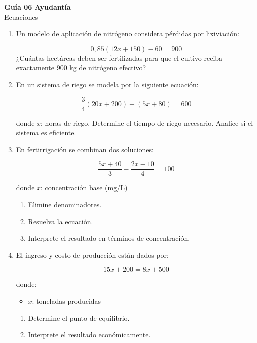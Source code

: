 \documentclass[11pt]{article}
\begin{document}
	
	\vspace*{0.5em}
	
	\begin{center}
		{\Large \textbf{Guía 06 Ayudantía}}\\[0.3em]
		{\small Ecuaciones}
	\end{center}
	
	\vspace{0.2cm}
	
	
	\begin{enumerate}
			\item 	Un modelo de aplicación de nitrógeno considera pérdidas por lixiviación:
			
			\[
			0{,}85(12x + 150) - 60 = 900
			\]
		¿Cuántas hectáreas deben ser fertilizadas para que el cultivo reciba exactamente 900 kg de nitrógeno efectivo?
		
		\item En un sistema de riego se modela por la siguiente ecuación:
				
		\[
		\frac{3}{4}(20x + 200) - (5x + 80) = 600
		\]
		
		donde $x$: horas de riego. Determine el tiempo de riego necesario. Analice si el sistema es eficiente.
		
		\item En fertirrigación se combinan dos soluciones:
		
		\[
		\frac{5x + 40}{3} - \frac{2x - 10}{4} = 100
		\]
		
		donde $x$: concentración base (mg/L)
		
		\begin{enumerate}
			\item Elimine denominadores.
			\item Resuelva la ecuación.
			\item Interprete el resultado en términos de concentración.
		\end{enumerate}
		
		\item El ingreso y costo de producción están dados por:
		
		\[
		15x + 200 = 8x + 500
		\]
		
		donde:
		\begin{itemize}
			\item $x$: toneladas producidas
		\end{itemize}
		
		\begin{enumerate}
			\item Determine el punto de equilibrio.
			\item Interprete el resultado económicamente.
		\end{enumerate}
		

\end{enumerate}
\end{document}
